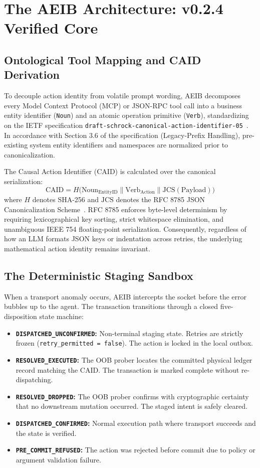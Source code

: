 \documentclass[10pt,journal,compsoc]{IEEEtran}
\begin{document}
\section{The AEIB Architecture: v0.2.4 Verified Core}

\subsection{Ontological Tool Mapping and CAID Derivation}
To decouple action identity from volatile prompt wording, AEIB decomposes every Model Context Protocol (MCP) or JSON-RPC tool call into a business entity identifier (\texttt{Noun}) and an atomic operation primitive (\texttt{Verb}), standardizing on the IETF specification \texttt{draft-schrock-canonical-action-identifier-05}~\cite{schrock2026caid}. In accordance with Section 3.6 of the specification (Legacy-Prefix Handling), pre-existing system entity identifiers and namespaces are normalized prior to canonicalization.

The Causal Action Identifier (CAID) is calculated over the canonical serialization:
\begin{equation}
\text{CAID} = H\Big(\text{Noun}_{\text{EntityID}} \parallel \text{Verb}_{\text{Action}} \parallel \text{JCS}(\text{Payload})\Big)
\end{equation}
where $H$ denotes SHA-256 and $\text{JCS}$ denotes the RFC 8785 JSON Canonicalization Scheme~\cite{rfc8785}. RFC 8785 enforces byte-level determinism by requiring lexicographical key sorting, strict whitespace elimination, and unambiguous IEEE 754 floating-point serialization. Consequently, regardless of how an LLM formats JSON keys or indentation across retries, the underlying mathematical action identity remains invariant.

\subsection{The Deterministic Staging Sandbox}
When a transport anomaly occurs, AEIB intercepts the socket before the error bubbles up to the agent. The transaction transitions through a closed five-disposition state machine:
\begin{itemize}
    \item \textbf{\texttt{DISPATCHED\_UNCONFIRMED}:} Non-terminal staging state. Retries are strictly frozen (\texttt{retry\_permitted = false}). The action is locked in the local outbox.
    \item \textbf{\texttt{RESOLVED\_EXECUTED}:} The OOB prober locates the committed physical ledger record matching the CAID. The transaction is marked complete without re-dispatching.
    \item \textbf{\texttt{RESOLVED\_DROPPED}:} The OOB prober confirms with cryptographic certainty that no downstream mutation occurred. The staged intent is safely cleared.
    \item \textbf{\texttt{DISPATCHED\_CONFIRMED}:} Normal execution path where transport succeeds and the state is verified.
    \item \textbf{\texttt{PRE\_COMMIT\_REFUSED}:} The action was rejected before commit due to policy or argument validation failure.
\end{itemize}
\end{document}
